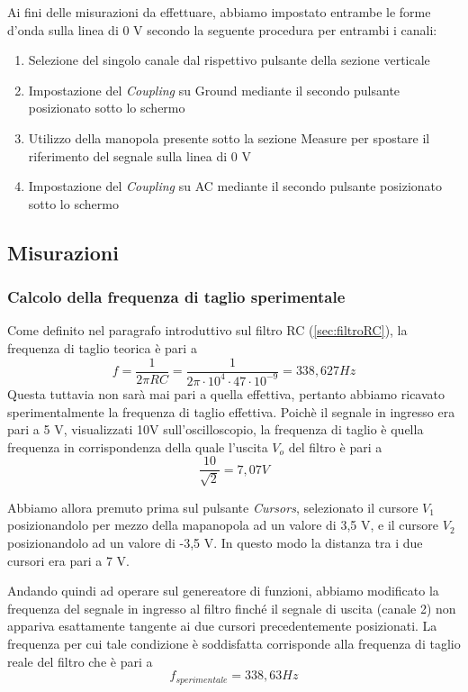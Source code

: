 \begin{itemize}
    Ai fini delle misurazioni da effettuare, abbiamo impostato entrambe le forme d'onda sulla linea di 0 V secondo la seguente procedura per entrambi i canali:
    \begin{enumerate}
        \item Selezione del singolo canale dal rispettivo pulsante della sezione verticale
        \item Impostazione del \emph{Coupling} su Ground mediante il secondo pulsante posizionato sotto lo schermo
        \item Utilizzo della manopola presente sotto la sezione Measure per spostare il riferimento del segnale sulla linea di 0 V
        \item Impostazione del \emph{Coupling} su AC mediante il secondo pulsante posizionato sotto lo schermo  
    \end{enumerate}
\end{itemize}

\clearpage

\subsection{Misurazioni}

\subsubsection{Calcolo della frequenza di taglio sperimentale}

Come definito nel paragrafo introduttivo sul filtro RC (\ref{sec:filtroRC}), la frequenza di taglio teorica è pari a
\[f=\frac{1}{2\pi RC}= \frac{1}{2\pi \cdot10^4 \cdot 47 \cdot10^{-9}} = 338,627 Hz\]
Questa tuttavia non sarà mai pari a quella effettiva, pertanto abbiamo ricavato sperimentalmente la frequenza di taglio effettiva. Poichè il segnale in ingresso era pari a 5 V, visualizzati 10V sull'oscilloscopio, la frequenza di taglio è quella frequenza in corrispondenza della quale l'uscita $V_{o}$ del filtro è pari a 
\[\frac{10}{\sqrt{2}} = 7,07 V\]

Abbiamo allora premuto prima sul pulsante \emph{Cursors}, selezionato il cursore $V_1$ posizionandolo per mezzo della mapanopola ad un valore di 3,5 V, 
e il cursore $V_2$ posizionandolo ad un valore di -3,5 V. In questo modo la distanza tra i due cursori era pari a 7 V.

Andando quindi ad operare sul genereatore di funzioni, abbiamo modificato la frequenza del segnale in ingresso al filtro finché il segnale di uscita (canale 2) non appariva esattamente tangente ai due cursori precedentemente posizionati.
La frequenza per cui tale condizione è soddisfatta corrisponde alla frequenza di taglio reale del filtro che è pari a 
\[f_{sperimentale} = 338,63Hz\]

